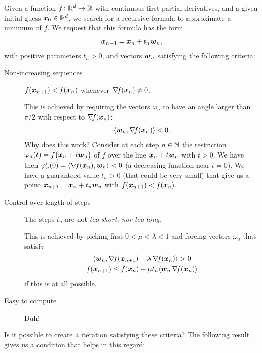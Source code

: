 Given a function $f \colon \mathbb{R}^d \to \mathbb{R}$ with continuous first partial derivatives, and a given initial guess $\boldsymbol{x}_0 \in \mathbb{R}^d$, we search for a recursive formula to approximate a minimum of $f$.  We request that this formula has the form
\begin{equation*}
\boldsymbol{x}_{n-1} = \boldsymbol{x}_n + t_n \boldsymbol{w}_n,
\end{equation*}
with positive parameters $t_n > 0$, and vectors $\boldsymbol{w}_n$ satisfying the following criteria:
\begin{description}
	\item[Non-increasing sequences] $f(\boldsymbol{x}_{n+1}) < f(\boldsymbol{x}_n)$ whenever $\mathop{\nabla\! {f}}(\boldsymbol{x}_n) \neq 0$. 

	\noindent This is achieved by requiring the vectors $\omega_n$ to have an angle larger than $\pi/2$ with respect to $\mathop{\nabla\! {f}}(\boldsymbol{x}_n)$:
	\begin{equation}
	\langle \boldsymbol{w}_n , \mathop{\nabla\! {f}}(\boldsymbol{x}_n) \rangle < 0.\label{Criterion2}
	\end{equation}
	Why does this work? Consider at each step $n \in \mathbb{N}$ the restriction $\varphi_n(t)=f\big( \boldsymbol{x}_n + t \boldsymbol{w}_n \big)$ of $f$ over the line $\boldsymbol{x}_n + t \boldsymbol{w}_n$ with $t>0$.  We have then $\varphi_n'(0) = \langle \mathop{\nabla\! {f}}(\boldsymbol{x}_n), \boldsymbol{w}_n \rangle < 0$ (a decreasing function near $t=0$).  We have a guaranteed value $t_n > 0$ (that could be very small) that give us a point $\boldsymbol{x}_{n+1} = \boldsymbol{x}_n + t_n \boldsymbol{w}_n$ with $f(\boldsymbol{x}_{n+1}) < f(\boldsymbol{x}_n)$.
	\item[Control over length of steps] The steps $t_n$ are not \emph{too short, nor too long}.

	\noindent This is achieved by picking first $0 < \mu < \lambda < 1$ and forcing vectors $\omega_n$ that satisfy
	\begin{gather}
	\langle \boldsymbol{w}_n , \mathop{\nabla\! {f}}(\boldsymbol{x}_{n+1}) - \lambda \mathop{\nabla\! {f}} (\boldsymbol{x}_n) \rangle > 0 \label{Criterion3}\\
	f(\boldsymbol{x}_{n+1}) \leq f(\boldsymbol{x}_n) + \mu t_n \langle \boldsymbol{w}_n \mathop{\nabla\! {f}}(\boldsymbol{x}_n) \rangle \label{Criterion4}
	\end{gather}
	if this is at all possible.
	\item[Easy to compute] Duh!
\end{description}

\separator

Is it possible to create a iteration satisfying these criteria?  The following result gives us a condition that helps in this regard:

